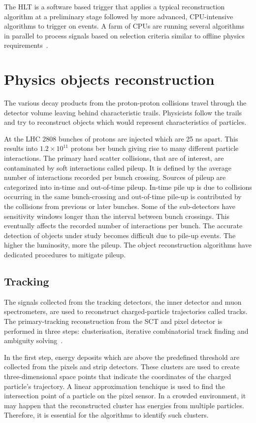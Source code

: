 The HLT is a software based trigger that applies a typical reconstruction algorithm at a preliminary stage 
followed by more advanced, CPU-intensive algorithms to trigger on events. A farm of CPUs are running several
algorithms in parallel to process signals based on selection criteria similar to offline physics requirements~\cite{C-Gabaldon_2012}.   



\section{Physics objects reconstruction}

The various decay products from the proton-proton collisions travel through the detector volume leaving
behind characteristic trails. Physicists follow the trails and try to reconstruct objects which would represent
characteristics of particles.

At the LHC 2808 bunches of protons are injected which are 25 ns apart. This results into 
$1.2 \times 10^{11}$ protons ber bunch giving rise to many different particle interactions. The 
primary hard scatter collisions, that are of interest, are contaminated by soft interactions 
called pileup. It is defined by the average number of interactions
recorded per bunch crossing. Sources of pileup are categorized into in-time and out-of-time pileup. In-time pile up is due to collisions
occurring in the same bunch-crossing and out-of-time pile-up is contributed by the collisions from previous
or later bunches. Some of the sub-detectors have sensitivity windows longer than the interval between
bunch crossings. This eventually affects the recorded number of interactions per bunch. The accurate
detection of objects under study becomes difficult due to pile-up events. The higher the 
luminosity, more the pileup. The object reconstruction algorithms have dedicated procedures 
to mitigate pileup.
\subsection{Tracking}
The signals collected from the tracking detectors, the inner detector and muon spectrometers, are used to reconstruct charged-particle trajectories called tracks. The primary-tracking
reconstruction from the SCT and pixel detector is performed in three steps: clusterisation, iterative combinatorial track finding and ambiguity solving~\cite{Aaboud_2017}. 

In the first step, energy deposits which are above the predefined threshold are collected from the pixels and strip detectors. These clusters are used to create
three-dimensional space points that indicate the coordinates of the charged particle's trajectory. A linear approximation tenchique is used to find the intersection
point of a particle on the pixel sensor. In a crowded environment, it may happen that the reconstructed cluster has energies from multiple particles. Therefore,
it is essential for the algorithms to identify such clusters. 

